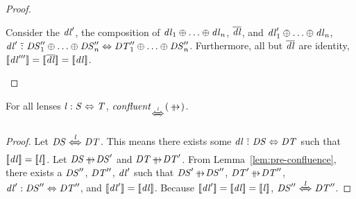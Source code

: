 \documentclass[acmsmall]{acmart}
\begin{document}
\begin{proof}
\begin{case}[\ParallelDNFStructuralRewriteRule{},\ParallelDNFStructuralRewriteRule{}]
\begin{enumerate}
      Consider the $\mathit{dl}'$, the composition of
      $\mathit{dl}_1 \oplus \ldots \oplus \mathit{dl}_n$, $\overline{\mathit{dl}}$, and
      $\mathit{dl}_1' \oplus \ldots \oplus \mathit{dl}_n$,
      $\mathit{dl}' \,\,\tilde{:}\,\, \mathit{DS}_1'' \oplus \ldots \oplus
      \mathit{DS}_n'' \Leftrightarrow
      \mathit{DT}_1'' \oplus \ldots \oplus \mathit{DS}_n''$.
      Furthermore, all but $\overline{\mathit{dl}}$ are identity,
      $[ \! [\mathit{dl}'''] \! ] = [ \! [\overline{\mathit{dl}}] \! ] =
      [ \! [\mathit{dl}] \! ]$.
    \end{enumerate}
  \end{case}
\end{proof}

\begin{theorem}
  \label{thm:parallel_confluence_noswap}
  For all lenses $\mathit{l} : \mathit{S} \Leftrightarrow \mathit{T}$,
  $\IsConfluentWithPropertyOf{\ParallelRewrite}{\DNFLensHasSemanticsOf{\Lens}}$.
\end{theorem}
\begin{proof}
  Let $\DNFRegex \DNFLensHasSemanticsOf{\Lens} \DNFRegexAlt$.
  This means there exists some $\mathit{dl} \,\,\tilde{:}\,\, \mathit{DS}
  \Leftrightarrow \mathit{DT}$ such that $[ \! [\mathit{dl}] \! ] =
  [ \! [\mathit{l}] \! ]$.
  Let $\DNFRegex \ParallelRewrite \DNFRegex'$ and $\DNFRegexAlt \ParallelRewrite
  \DNFRegexAlt'$.  From Lemma~\ref{lem:pre-confluence}, there exists a
  $\mathit{DS}''$, $\mathit{DT}''$, $\mathit{dl}'$ such that $\DNFRegex'
  \ParallelRewrite
  \DNFRegex''$, $\DNFRegexAlt' \ParallelRewrite \DNFRegexAlt''$, $\mathit{dl}'
  :
  \mathit{DS}'' \Leftrightarrow \mathit{DT}''$, and $[ \! [\mathit{dl}'] \! ] =
  [ \! [\mathit{dl}] \! ]$.  Because $[ \! [\mathit{dl}'] \! ] =
  [ \! [\mathit{dl}] \! ] = [ \! [\mathit{l}] \! ]$, $\DNFRegex''
  \DNFLensHasSemanticsOf{\Lens} \DNFRegexAlt''$.
\end{proof}
\end{document}
